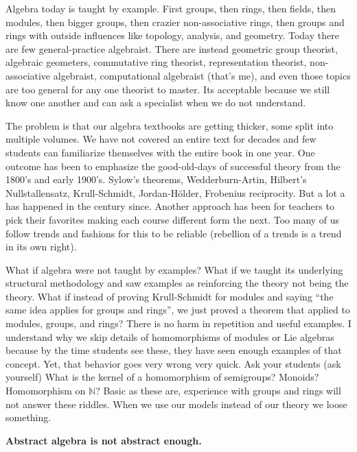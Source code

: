 
Algebra today is taught by example. First groups, then rings,
then fields, then modules, then bigger groups, then crazier non-associative
rings, then groups and rings with outside influences like topology, analysis,
and geometry. Today there are few general-practice algebraist.  There are
instead geometric group theorist, algebraic geometers, commutative ring
theorist, representation theorist, non-associative algebraist, computational
algebraist (that's me), and even those topics are too general for any one
theorist to master. Its acceptable because we still know one another and can ask
a specialist when we do not understand. 

The problem is that our algebra textbooks are getting thicker, some split into
multiple volumes. We have not covered an entire text for decades and few  
students can familiarize themselves with the entire book in one year.
One outcome has been to emphasize the good-old-days of successful theory from the
1800's and early 1900's.  Sylow's theorems, Wedderburn-Artin, Hilbert's
Nullstallensatz, Krull-Schmidt, Jordan-H\"older, Frobenius reciprocity. But a
lot a has happened in the century since.  Another approach has been for teachers to
pick their favorites making each course different form the next.  
Too many of us follow trends and fashions for this to be reliable (rebellion of 
a trends is a trend in its own right).

What if algebra were not taught by examples?  What if we taught its
underlying structural methodology and saw examples as reinforcing the theory
not being the theory.  What if instead of proving Krull-Schmidt for modules and
saying ``the same idea applies for groups and rings'', we just proved a theorem
that applied to modules, groups, and rings?  There is no harm in repetition and
useful examples.  I understand why we skip details of homomorphisms of modules
or Lie algebras because by the time students see these, they have seen enough
examples of that concept.  Yet, that behavior goes very wrong very quick.  Ask
your students (ask yourself) What is the kernel of a homomorphism of semigroups?
Monoids?  Homomorphism on $\mathbb{N}$?  Basic as these are, experience 
with groups and rings will not answer these riddles.
When we use our models instead of our theory 
we loose something.  

\begin{center}
    \textbf{Abstract algebra is not abstract enough.}
\end{center}